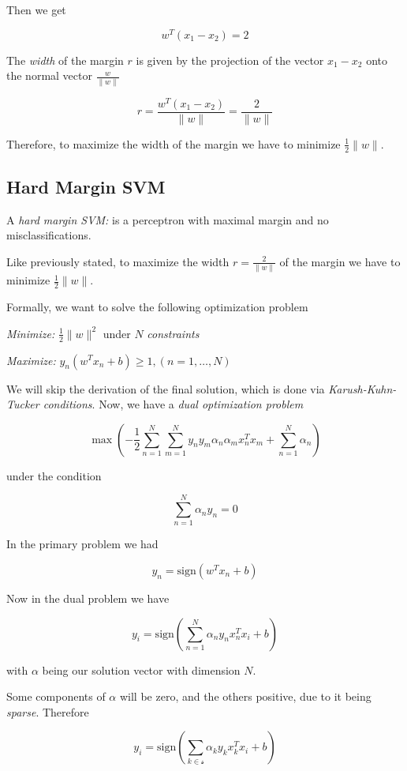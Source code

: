Then we get 

\[
    w^T (x_1 - x_2) = 2
\]

The \emph{width} of the margin \(r\) is given by the projection of the vector \(x_1 - x_2\) onto the
normal vector \(\frac{w}{\|w\|}\)

\[
    r = \frac{w^T (x_1 - x_2)}{\|w\|} = \frac{2}{\|w\|}
\]

Therefore, to maximize the width of the margin we have to minimize \(\frac{1}{2}\|w\|\).

\subsection{Hard Margin SVM}

A \emph{hard margin SVM:} is a perceptron with maximal margin and no misclassifications.

Like previously stated, to maximize the width \(r = \frac{2}{\|w\|}\) of the margin we have to minimize \(\frac{1}{2}\|w\|\).

Formally, we want to solve the following optimization problem 

\emph{Minimize:} \(\frac{1}{2}\|w\|^2\) under \(N\) \emph{constraints} 

\emph{Maximize:} \(y_n (w^T x_n + b) \ge 1, (n = 1, \dots, N)\)

We will skip the derivation of the final solution, which is done via \emph{Karush-Kuhn-Tucker conditions}. Now, 
we have a \emph{dual optimization problem} 

\[
    \max \left(- \frac{1}{2} \sum_{n = 1}^{N}\sum_{m = 1}^{N} y_n y_m \alpha_n \alpha_m x_n^T x_m + \sum_{n = 1}^{N} \alpha_n \right)
\]

under the condition 

\[
    \sum_{n = 1}^{N} \alpha_n y_n = 0
\]

In the primary problem we had 

\[
    y_n = \text{sign}(w^T x_n + b)
\]

Now in the dual problem we have

\[
    y_i = \text{sign} \left(\sum_{n = 1}^{N} \alpha_n y_n x_n^T x_i + b \right)
\]

with \(\alpha\) being our solution vector with dimension \(N\).

Some components of \(\alpha\) will be zero, and the others positive, due to it being \emph{sparse}. Therefore 

\[
    y_i = \text{sign} \left(\sum_{k \in \mathcal{s}} \alpha_k y_k x_k^T x_i + b \right)
\]

